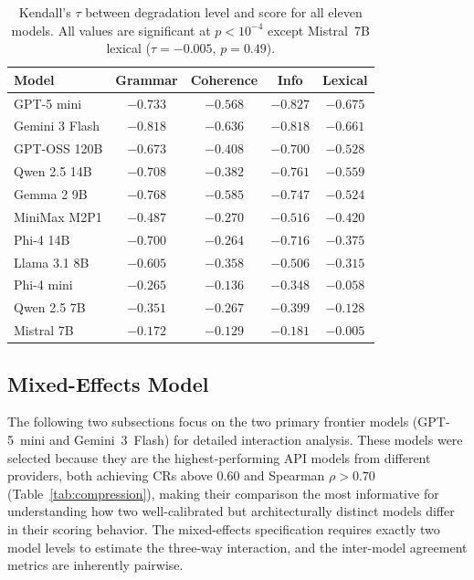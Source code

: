 \documentclass[11pt]{article}
\begin{document}
\begin{table}[H]
\centering
\caption{Kendall's $\tau$ between degradation level and score for all eleven models. All values are significant at $p < 10^{-4}$ except Mistral~7B lexical ($\tau = -0.005$, $p = 0.49$).}
\label{tab:tau}
\small
\begin{tabular}{@{}lcccc@{}}
\toprule
\textbf{Model} & \textbf{Grammar} & \textbf{Coherence} & \textbf{Info} & \textbf{Lexical} \\
\midrule
GPT-5 mini & $-0.733$ & $-0.568$ & $-0.827$ & $-0.675$ \\
Gemini 3 Flash & $-0.818$ & $-0.636$ & $-0.818$ & $-0.661$ \\
GPT-OSS 120B & $-0.673$ & $-0.408$ & $-0.700$ & $-0.528$ \\
Qwen 2.5 14B & $-0.708$ & $-0.382$ & $-0.761$ & $-0.559$ \\
Gemma 2 9B & $-0.768$ & $-0.585$ & $-0.747$ & $-0.524$ \\
MiniMax M2P1 & $-0.487$ & $-0.270$ & $-0.516$ & $-0.420$ \\
Phi-4 14B & $-0.700$ & $-0.264$ & $-0.716$ & $-0.375$ \\
Llama 3.1 8B & $-0.605$ & $-0.358$ & $-0.506$ & $-0.315$ \\
Phi-4 mini & $-0.265$ & $-0.136$ & $-0.348$ & $-0.058$ \\
Qwen 2.5 7B & $-0.351$ & $-0.267$ & $-0.399$ & $-0.128$ \\
Mistral 7B & $-0.172$ & $-0.129$ & $-0.181$ & $-0.005$ \\
\bottomrule
\end{tabular}
\end{table}

\FloatBarrier
\subsection{Mixed-Effects Model}
\label{sec:mixedeffects}

The following two subsections focus on the two primary frontier models (GPT-5~mini and Gemini~3~Flash) for detailed interaction analysis. These models were selected because they are the highest-performing API models from different providers, both achieving CRs above 0.60 and Spearman $\rho > 0.70$ (Table~\ref{tab:compression}), making their comparison the most informative for understanding how two well-calibrated but architecturally distinct models differ in their scoring behavior. The mixed-effects specification requires exactly two model levels to estimate the three-way interaction, and the inter-model agreement metrics are inherently pairwise.
\end{document}
